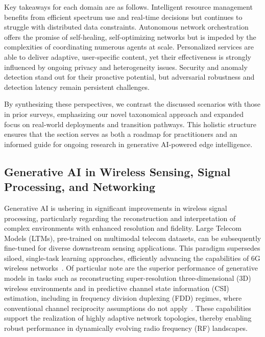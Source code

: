 \documentclass[sigconf]{acmart}
\begin{document}
Key takeaways for each domain are as follows. Intelligent resource management benefits from efficient spectrum use and real-time decisions but continues to struggle with distributed data constraints. Autonomous network orchestration offers the promise of self-healing, self-optimizing networks but is impeded by the complexities of coordinating numerous agents at scale. Personalized services are able to deliver adaptive, user-specific content, yet their effectiveness is strongly influenced by ongoing privacy and heterogeneity issues. Security and anomaly detection stand out for their proactive potential, but adversarial robustness and detection latency remain persistent challenges.

By synthesizing these perspectives, we contrast the discussed scenarios with those in prior surveys, emphasizing our novel taxonomical approach and expanded focus on real-world deployments and transition pathways. This holistic structure ensures that the section serves as both a roadmap for practitioners and an informed guide for ongoing research in generative AI-powered edge intelligence.

\subsection{Generative AI in Wireless Sensing, Signal Processing, and Networking}

Generative AI is ushering in significant improvements in wireless signal processing, particularly regarding the reconstruction and interpretation of complex environments with enhanced resolution and fidelity. Large Telecom Models (LTMs), pre-trained on multimodal telecom datasets, can be subsequently fine-tuned for diverse downstream sensing applications. This paradigm supersedes siloed, single-task learning approaches, efficiently advancing the capabilities of 6G wireless networks~\cite{ref15,ref33}. Of particular note are the superior performance of generative models in tasks such as reconstructing super-resolution three-dimensional (3D) wireless environments and in predictive channel state information (CSI) estimation, including in frequency division duplexing (FDD) regimes, where conventional channel reciprocity assumptions do not apply~\cite{ref15,ref26,ref33}. These capabilities support the realization of highly adaptive network topologies, thereby enabling robust performance in dynamically evolving radio frequency (RF) landscapes.
\end{document}
